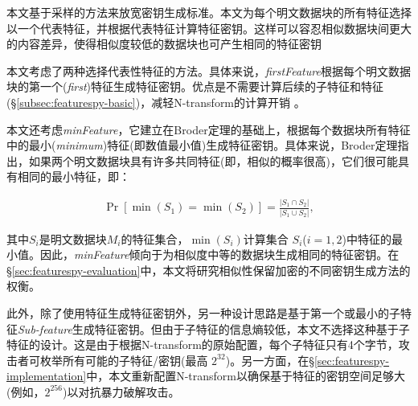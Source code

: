 本文基于采样的方法来放宽密钥生成标准。本文为每个明文数据块的所有特征选择以一个代表特征，并根据代表特征计算特征密钥。这样可以容忍相似数据块间更大的内容差异，使得相似度较低的数据块也可产生相同的特征密钥

本文考虑了两种选择代表性特征的方法。具体来说，\textit{firstFeature}根据每个明文数据块的第一个(\textit{first})特征生成特征密钥。优点是不需要计算后续的子特征和特征(\S\ref{subsec:featurespy-basic})，减轻N-transform的计算开销 。

本文还考虑\textit{minFeature}，它建立在Broder定理的基础上，根据每个数据块所有特征中的最小(\textit{minimum})特征(即数值最小值)生成特征密钥。具体来说，Broder定理指出，如果两个明文数据块具有许多共同特征(即，相似的概率很高)，它们很可能具有相同的最小特征，即：

\begin{eqnarray}
    \label{eq:featurespy-broder}
    \Pr[\min(S_1) = \min(S_2)] = \frac{|S_1 \cap S_2|}{|S_1 \cup S_2|},
\end{eqnarray}

其中$S_i$是明文数据块$M_i$的特征集合，$\min(S_i)$计算集合 $S_i$($i = 1, 2$)中特征的最小值。因此，\textit{minFeature}倾向于为相似度中等的数据块生成相同的特征密钥。在\S\ref{sec:featurespy-evaluation}中，本文将研究相似性保留加密的不同密钥生成方法的权衡。

此外，除了使用特征生成特征密钥外，另一种设计思路是基于第一个或最小的子特征\textit{Sub-feature}生成特征密钥。但由于子特征的信息熵较低，本文不选择这种基于子特征的设计。这是由于根据N-transform的原始配置，每个子特征只有4个字节，攻击者可枚举所有可能的子特征/密钥(最高 $2^{32}$)。另一方面，在\S\ref{sec:featurespy-implementation}中，本文重新配置N-transform以确保基于特征的密钥空间足够大(例如，$2^{256}$)以对抗暴力破解攻击。